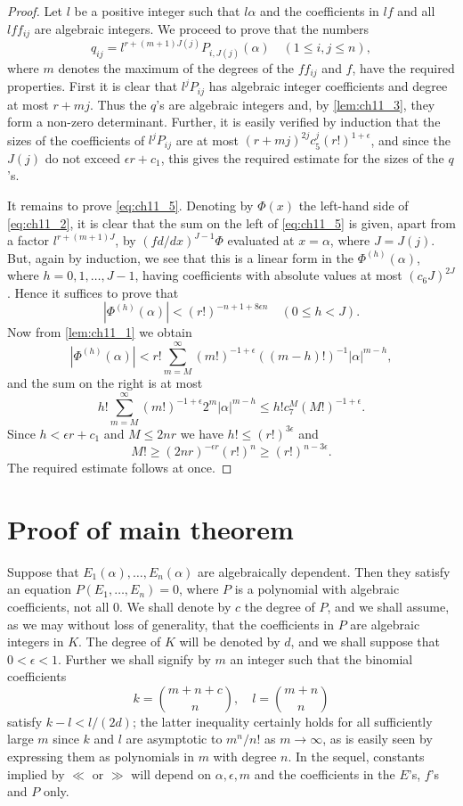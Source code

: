 \begin{proof}
Let $l$ be a positive integer such that $l\alpha$ and the coefficients in $l f$ and all $l f f_{ij}$ are algebraic integers. We proceed to prove that the numbers
\[q_{ij} = l^{r+(m+1)J(j)} P_{i, J(j)}(\alpha) \quad (1 \leq i, j \leq n),\]
where $m$ denotes the maximum of the degrees of the $f f_{ij}$ and $f$, have the required properties. First it is clear that $l^j P_{ij}$ has algebraic integer coefficients and degree at most $r+mj$. Thus the $q$'s are algebraic integers and, by \autoref{lem:ch11_3}, they form a non-zero determinant. Further, it is easily verified by induction that the sizes of the coefficients of $l^j P_{ij}$ are at most $(r+mj)^{2j} c_5^j (r!)^{1+\epsilon}$, and since the $J(j)$ do not exceed $\epsilon r+c_1$, this gives the required estimate for the sizes of the $q$'s.

It remains to prove \eqref{eq:ch11_5}. Denoting by $\Phi(x)$ the left-hand side of \eqref{eq:ch11_2}, it is clear that the sum on the left of \eqref{eq:ch11_5} is given, apart from a factor $l^{r+(m+1)J}$, by $(f d/dx)^{J-1}\Phi$ evaluated at $x=\alpha$, where $J=J(j)$. But, again by induction, we see that this is a linear form in the $\Phi^{(h)}(\alpha)$, where $h=0,1,\dots,J-1$, having coefficients with absolute values at most $(c_6 J)^{2J}$. Hence it suffices to prove that
\[|\Phi^{(h)}(\alpha)| < (r!)^{-n+1+8\epsilon n} \quad (0 \le h < J).\]
Now from \autoref{lem:ch11_1} we obtain
\[|\Phi^{(h)}(\alpha)| < r! \sum_{m=M}^{\infty} (m!)^{-1+\epsilon} ((m-h)!)^{-1} |\alpha|^{m-h},\]
and the sum on the right is at most
\[h! \sum_{m=M}^{\infty} (m!)^{-1+\epsilon} 2^m |\alpha|^{m-h} \leqslant h! c_7^M (M!)^{-1+\epsilon}.\]
Since $h < \epsilon r + c_1$ and $M \leq 2nr$ we have $h! \leq (r!)^{3\epsilon}$ and
\[M! \geqslant (2nr)^{-\epsilon r} (r!)^n \geqslant (r!)^{n-3\epsilon}.\]
The required estimate follows at once.
\end{proof}

\section{Proof of main theorem}\label{sec:ch11_4}

Suppose that $E_1(\alpha), \ldots, E_n(\alpha)$ are algebraically dependent. Then they satisfy an equation $P(E_1, \ldots, E_n) = 0$, where $P$ is a polynomial with algebraic coefficients, not all 0. We shall denote by $c$ the degree of $P$, and we shall assume, as we may without loss of generality, that the coefficients in $P$ are algebraic integers in $K$. The degree of $K$ will be denoted by $d$, and we shall suppose that $0 < \epsilon < 1$. Further we shall signify by $m$ an integer such that the binomial coefficients
\[k = \binom{m+n+c}{n}, \quad l = \binom{m+n}{n}\]
satisfy $k - l < l/(2d)$; the latter inequality certainly holds for all sufficiently large $m$ since $k$ and $l$ are asymptotic to $m^n/n!$ as $m \to \infty$, as is easily seen by expressing them as polynomials in $m$ with degree $n$. In the sequel, constants implied by $\ll$ or $\gg$ will depend on $\alpha, \epsilon, m$ and the coefficients in the $E$'s, $f$'s and $P$ only.

